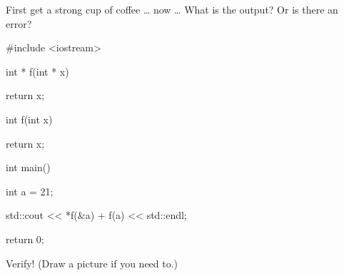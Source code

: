 First get a strong cup of coffee \ldots{} now \ldots{} What is the output? Or is there an error?



\begin{consolethree}[escapeinside=||]

#include <iostream>



int * f(int * x)

{   

    return x;

}



int f(int x)

{   

    return x;

}



int main()

{   

    int a = 21;

    std::cout << *f(&a) + f(a) << std::endl;

    return 0;

}

\end{consolethree}

Verify! (Draw a picture if you need to.)

